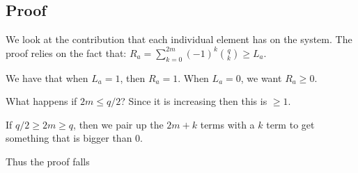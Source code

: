 \documentclass[]{article}
\theoremstyle{definition}
\numberwithin{theorem}{section}
\numberwithin{equation}{section}
\begin{document}
\subsection{Proof}
We look at the contribution that each individual element has on the system. 
The proof relies on the fact that:
$R_a = \sum_{k = 0}^{2m} (-1)^k \binom{q}{k} \geq L_a$. 

We have that when $L_a = 1$, then $R_a = 1$. When $L_a = 0$, we want $R_a \geq 0$. 

What happens if $2m \leq q/2$? Since it is increasing then this is $\geq 1$.

If $q/2 \geq 2m \geq q$, then we pair up the $2m + k$ terms with a $k$ term to get something that is bigger than 0.

Thus the proof falls 
\end{document}
